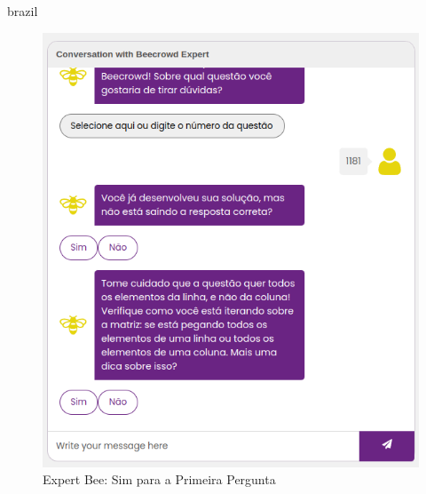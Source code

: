 \begin{otherlanguage*}{brazil}
\begin{figure}[H]
    \centering
            \caption{Expert Bee: Sim para a Primeira Pergunta}
            \label{fig:ModeloConceitual}
        \includegraphics[scale=0.63]{pictures/desenvolvimento/expert_bee_primeira_pergunta_sim.png}
\end{figure}


\end{otherlanguage*}
